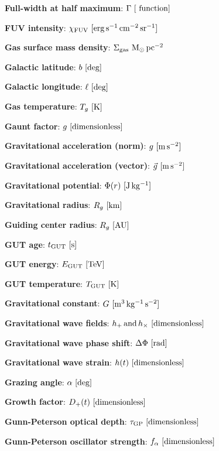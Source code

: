 \documentclass[a4paper,10pt]{article}
\begin{document}
{\noindent}\textbf{Full-width at half maximum}: $\Gamma ~ [{\rm ~ function}]$

{\noindent}\textbf{FUV intensity}: $\chi_{\rm FUV} ~ [{\rm erg\,s^{-1}\,cm^{-2}\,sr^{-1}}]$

{\noindent}\textbf{Gas surface mass density}: $\Sigma_\mathrm{gas} ~ {\rm M_\odot\,pc^{-2}}$

{\noindent}\textbf{Galactic latitude}: $b ~ [{\rm deg}]$

{\noindent}\textbf{Galactic longitude}: $\ell ~ [{\rm deg}]$

{\noindent}\textbf{Gas temperature}: $T_g ~ [{\rm K}]$

{\noindent}\textbf{Gaunt factor}: $g ~ [{\rm dimensionless}]$

{\noindent}\textbf{Gravitational acceleration (norm)}: $g ~ [{\rm m\,s^{-2}}]$

{\noindent}\textbf{Gravitational acceleration (vector)}: $\vec{g} ~ [{\rm m\,s^{-2}}]$

{\noindent}\textbf{Gravitational potential}: $\Phi(r) ~ [{\rm J\,kg^{-1}}]$

{\noindent}\textbf{Gravitational radius}: $R_g ~ [{\rm km}]$

{\noindent}\textbf{Guiding center radius}: $R_g ~ [{\rm AU}]$

{\noindent}\textbf{GUT age}: $t_\mathrm{GUT} ~ [{\rm s}]$

{\noindent}\textbf{GUT energy}: $E_\mathrm{GUT} ~ [{\rm TeV}]$

{\noindent}\textbf{GUT temperature}: $T_\mathrm{GUT} ~ [{\rm K}]$

{\noindent}\textbf{Gravitational constant}: $G ~ [{\rm m^3\,kg^{-1}\,s^{-2}}]$

{\noindent}\textbf{Gravitational wave fields}: $h_+\,{\rm and}\,h_\times ~
[{\rm dimensionless}]$

{\noindent}\textbf{Gravitational wave phase shift}: $\Delta\Phi ~ [{\rm rad}]$

{\noindent}\textbf{Gravitational wave strain}: $h(t) ~ [{\rm dimensionless}]$

{\noindent}\textbf{Grazing angle}: $\alpha ~ [{\rm deg}]$

{\noindent}\textbf{Growth factor}: $D_+(t) ~ [{\rm dimensionless}]$

{\noindent}\textbf{Gunn-Peterson optical depth}: $\tau_\mathrm{GP} ~ [{\rm dimensionless}]$

{\noindent}\textbf{Gunn-Peterson oscillator strength}: $f_\alpha ~ [{\rm dimensionless}]$
\end{document}
